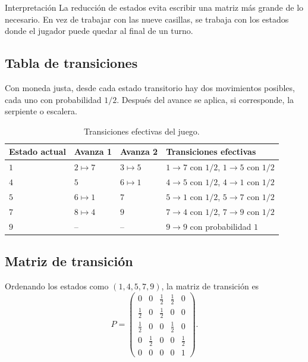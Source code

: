 \documentclass[12pt,a4paper]{article}
\theoremstyle{definition}
\begin{document}
\begin{cajaIdea}{Interpretación}
La reducción de estados evita escribir una matriz más grande de lo necesario. En vez de trabajar con las nueve casillas, se trabaja con los estados donde el jugador puede quedar al final de un turno.
\end{cajaIdea}

\subsection{Tabla de transiciones}

Con moneda justa, desde cada estado transitorio hay dos movimientos posibles, cada uno con probabilidad \(1/2\). Después del avance se aplica, si corresponde, la serpiente o escalera.

\begin{table}[H]
\centering
\renewcommand{\arraystretch}{1.25}
\begin{tabular}{C{1.5cm} C{2.5cm} C{2.5cm} L{5.4cm}}
\toprule
Estado actual & Avanza 1 & Avanza 2 & Transiciones efectivas \\
\midrule
\(1\) & \(2\mapsto 7\) & \(3\mapsto 5\) & \(1\to 7\) con \(1/2\), \(1\to 5\) con \(1/2\) \\
\(4\) & \(5\) & \(6\mapsto 1\) & \(4\to 5\) con \(1/2\), \(4\to 1\) con \(1/2\) \\
\(5\) & \(6\mapsto 1\) & \(7\) & \(5\to 1\) con \(1/2\), \(5\to 7\) con \(1/2\) \\
\(7\) & \(8\mapsto 4\) & \(9\) & \(7\to 4\) con \(1/2\), \(7\to 9\) con \(1/2\) \\
\(9\) & -- & -- & \(9\to 9\) con probabilidad \(1\) \\
\bottomrule
\end{tabular}
\caption{Transiciones efectivas del juego.}
\end{table}

\subsection{Matriz de transición}

Ordenando los estados como \((1,4,5,7,9)\), la matriz de transición es
\[
P=
\begin{pmatrix}
0 & 0 & \frac12 & \frac12 & 0\\
\frac12 & 0 & \frac12 & 0 & 0\\
\frac12 & 0 & 0 & \frac12 & 0\\
0 & \frac12 & 0 & 0 & \frac12\\
0 & 0 & 0 & 0 & 1
\end{pmatrix}.
\]
\end{document}
